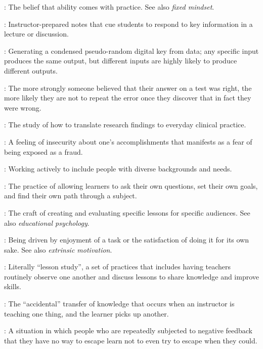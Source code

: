 \begin{description}
: The belief that ability comes with
practice. See also \emph{fixed mindset}.

: Instructor-prepared notes that cue
students to respond to key information in a lecture or discussion.

: Generating a condensed pseudo-random digital key
from data; any specific input produces the same output, but different inputs are
highly likely to produce different outputs.

: The more strongly someone
believed that their answer on a test was right, the more likely they are not to
repeat the error once they discover that in fact they were wrong.

: The study of how to
translate research findings to everyday clinical practice.

: A feeling of insecurity about
one's accomplishments that manifests as a fear of being exposed as a fraud.

: Working actively to include people with
diverse backgrounds and needs.

: The practice of
allowing learners to ask their own questions, set their own goals, and find
their own path through a subject.

: The craft of creating and
evaluating specific lessons for specific audiences. See also \emph{educational
  psychology}.

: Being driven by enjoyment
of a task or the satisfaction of doing it for its own sake.  See also
\emph{extrinsic motivation}.

: Literally ``lesson study'', a set of
practices that includes having teachers routinely observe one another and
discuss lessons to share knowledge and improve skills.

: The
``accidental'' transfer of knowledge that occurs when an instructor is teaching
one thing, and the learner picks up another.

: A situation in which
people who are repeatedly subjected to negative feedback that they have no way
to escape learn not to even try to escape when they could.


\end{description}
